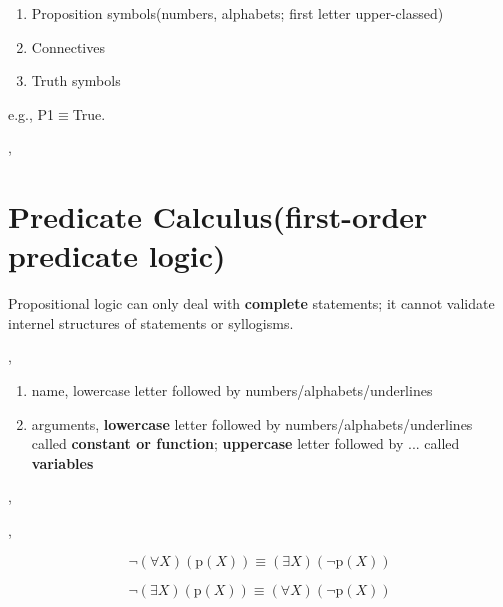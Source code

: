 \documentclass{article}
\begin{document}
	\begin{enumerate}
		\item Proposition symbols(numbers, alphabets; first letter upper-classed)
		\item Connectives
		\item Truth symbols
	\end{enumerate}

	e.g., P1$\equiv$True.

	\sep

	\part{Predicate Calculus(first-order predicate logic)}


	\answer

	Propositional logic can only deal with \textbf{complete} statements; it cannot validate internel structures of statements or syllogisms.

	\sep
	

	\answer

	\begin{enumerate}
		\item name, lowercase letter followed by numbers/alphabets/underlines
		\item arguments, \textbf{lowercase} letter followed by numbers/alphabets/underlines called \textbf{constant or function}; \textbf{uppercase} letter followed by ... called \textbf{variables}
	\end{enumerate}

	\sep
	


	\sep


	\answer

	$$\lnot (\forall X)(\text{p}(X))\equiv(\exists X)(\lnot \text{p}(X))$$

	$$\lnot (\exists X)(\text{p}(X))\equiv(\forall X)(\lnot \text{p}(X))$$
\end{document}
